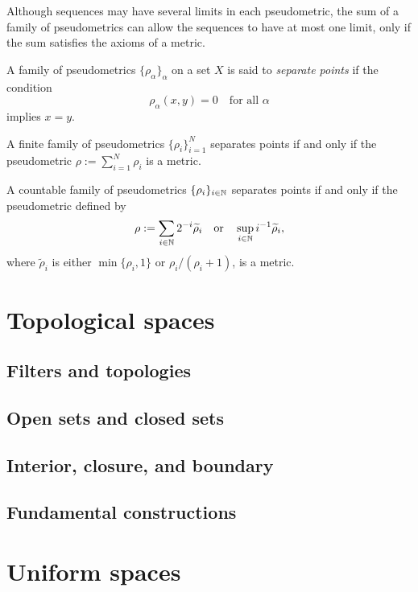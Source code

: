 \documentclass{../note}
\begin{document}
Although sequences may have several limits in each pseudometric, the sum of a family of pseudometrics can allow the sequences to have at most one limit, only if the sum satisfies the axioms of a metric.

\begin{defn}
A family of pseudometrics $\{\rho_\alpha\}_\alpha$ on a set $X$ is said to \emph{separate points} if the condition 
\[\rho_\alpha(x,y)=0\quad\text{for all $\alpha$}\]
implies $x=y$.
\end{defn}
\begin{prop}
\begin{parts}
\item
A finite family of pseudometrics $\{\rho_i\}_{i=1}^N$ separates points if and only if the pseudometric $\rho:=\sum_{i=1}^N\rho_i$ is a metric.
\item
A countable family of pseudometrics $\{\rho_i\}_{i\in\mathbb{N}}$ separates points if and only if the pseudometric defined by
\[\rho:=\sum_{i\in\mathbb{N}}2^{-i}\widetilde\rho_i\quad\text{or}\quad\sup_{i\in\mathbb{N}}i^{-1}\widetilde\rho_i,\]
where $\tilde\rho_i$ is either $\min\{\rho_i,1\}$ or $\rho_i/(\rho_i+1)$, is a metric.
\end{parts}
\end{prop}




\chapter{Topological spaces}

\section{Filters and topologies}

\section{Open sets and closed sets}

\section{Interior, closure, and boundary}

\section{Fundamental constructions}


\chapter{Uniform spaces}
\end{document}
